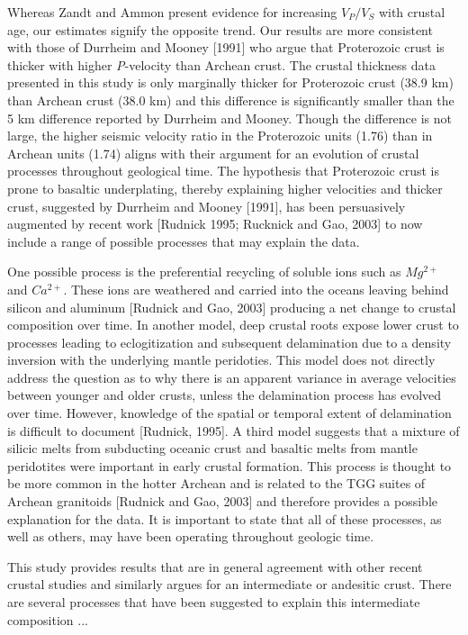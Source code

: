 \documentclass[draft, 12pt]{article}
\begin{document}
Whereas Zandt and Ammon present evidence for increasing $V_P/V_S$ with crustal age, our estimates signify the opposite trend. Our results are more consistent with those of Durrheim and Mooney [1991] who argue that Proterozoic crust is thicker with higher {\it P}-velocity than Archean crust. The crustal thickness data presented in this study is only marginally thicker for Proterozoic crust (38.9 km) than Archean crust (38.0 km) and this difference is significantly smaller than the 5 km difference reported by Durrheim and Mooney. Though the difference is not large, the higher seismic velocity ratio in the Proterozoic units (1.76) than in Archean units (1.74) aligns with their argument for an evolution of crustal processes throughout geological time. The hypothesis that Proterozoic crust is prone to basaltic underplating, thereby explaining higher velocities and thicker crust, suggested by Durrheim and Mooney [1991], has been persuasively augmented by recent work [Rudnick 1995; Rucknick and Gao, 2003] to now include a range of possible processes that may explain the data.

One possible process is the preferential recycling of soluble ions such as $Mg^{2+}$ and $Ca^{2+}$. These ions are weathered and carried into the oceans leaving behind silicon and aluminum [Rudnick and Gao, 2003] producing a net change to crustal composition over time. In another model, deep crustal roots expose lower crust to processes leading to eclogitization and subsequent delamination due to a density inversion with the underlying mantle peridoties. This model does not directly address the question as to why there is an apparent variance in average velocities between younger and older crusts, unless the delamination process has evolved over time. However, knowledge of the spatial or temporal extent of delamination is difficult to document [Rudnick, 1995]. A third model suggests that a mixture of silicic melts from subducting oceanic crust and basaltic melts from mantle peridotites were important in early crustal formation. This process is thought to be more common in the hotter Archean and is related to the TGG suites of Archean granitoids [Rudnick and Gao, 2003] and therefore provides a possible explanation for the data. It is important to state that all of these processes, as well as others, may have been operating throughout geologic time.

This study provides results that are in general agreement with other recent crustal studies and similarly argues for an intermediate or andesitic crust. There are several processes that have been suggested to explain this intermediate composition ...
\end{document}
